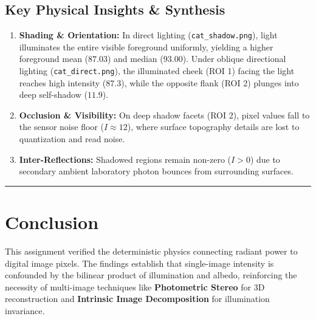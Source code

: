 \documentclass[12pt]{article}
\begin{document}
\subsection*{Key Physical Insights \& Synthesis}
\begin{enumerate}
    \item \textbf{Shading \& Orientation:} In direct lighting (\texttt{cat\_shadow.png}), light illuminates the entire visible foreground uniformly, yielding a higher foreground mean ($87.03$) and median ($93.00$). Under oblique directional lighting (\texttt{cat\_direct.png}), the illuminated cheek (ROI 1) facing the light reaches high intensity ($87.3$), while the opposite flank (ROI 2) plunges into deep self-shadow ($11.9$).
    \item \textbf{Occlusion \& Visibility:} On deep shadow facets (ROI 2), pixel values fall to the sensor noise floor ($I \approx 12$), where surface topography details are lost to quantization and read noise.
    \item \textbf{Inter-Reflections:} Shadowed regions remain non-zero ($I > 0$) due to secondary ambient laboratory photon bounces from surrounding surfaces.
\end{enumerate}

\vspace{0.3cm}
\hrule
\vspace{0.3cm}

\section*{Conclusion}
This assignment verified the deterministic physics connecting radiant power to digital image pixels. The findings establish that single-image intensity is confounded by the bilinear product of illumination and albedo, reinforcing the necessity of multi-image techniques like \textbf{Photometric Stereo} for 3D reconstruction and \textbf{Intrinsic Image Decomposition} for illumination invariance.
\end{document}
